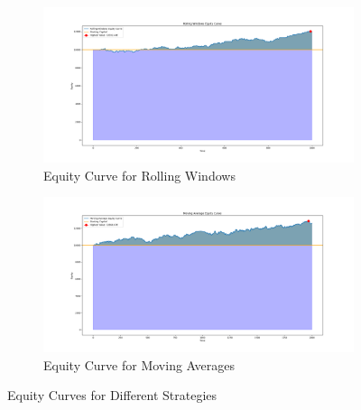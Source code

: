 \documentclass{imc-inf}
\begin{document}
\begin{figure}[h!]
				\begin{subfigure}{0.45\textwidth}
					\centering
					\includegraphics[width=\textwidth]{equity_curve_rolling_windows.png}
					\caption{Equity Curve for Rolling Windows}
					\label{fig:equity_curve_rolling_windows}
				\end{subfigure}
				\hfill
				\begin{subfigure}{0.45\textwidth}
					\centering
					\includegraphics[width=\textwidth]{equity_curve_moving_averages.png}
					\caption{Equity Curve for Moving Averages}
					\label{fig:equity_curve_moving_averages}
				\end{subfigure}

				\caption{Equity Curves for Different Strategies}
				\label{fig:combined_equity_curves}
			\end{figure}
		
\end{document}
